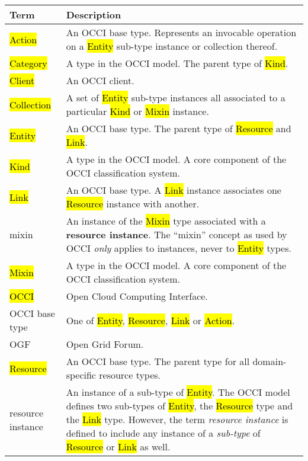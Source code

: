 \begin{tabular}{l|p{12cm}}
Term & Description \\
\hline
\hl{Action} & An OCCI base type. Represents an invocable operation on a \hl{Entity} sub-type instance or collection thereof. \\

\hl{Category} & A type in the OCCI model. The parent type of \hl{Kind}. \\

\hl{Client} & An OCCI client.\\

\hl{Collection} & A set of \hl{Entity} sub-type instances all associated to a particular \hl{Kind} or \hl{Mixin} instance. \\

\hl{Entity} & An OCCI base type. The parent type of \hl{Resource} and \hl{Link}. \\

\hl{Kind} & A type in the OCCI model. A core component of the OCCI classification system. \\

\hl{Link} & An OCCI base type. A \hl{Link} instance associates one \hl{Resource} instance with another. \\

mixin & An instance of the \hl{Mixin} type associated with a {\bf resource
 instance}. The ``mixin'' concept as used by OCCI {\em only} applies to
 instances, never to \hl{Entity} types. \\

\hl{Mixin} & A type in the OCCI model. A core component of the OCCI classification system. \\

\hl{OCCI} & Open Cloud Computing Interface. \\

OCCI base type & One of \hl{Entity}, \hl{Resource}, \hl{Link} or \hl{Action}. \\

OGF & Open Grid Forum. \\

\hl{Resource} & An OCCI base type. The parent type for all domain-specific resource types. \\

resource instance & An instance of a sub-type of \hl{Entity}. The OCCI
 model defines two sub-types of \hl{Entity}, the \hl{Resource} type and the
 \hl{Link} type. However, the term {\em resource instance} is defined to
 include any instance of a {\em sub-type} of \hl{Resource} or \hl{Link} as
 well. \\


\end{tabular}
